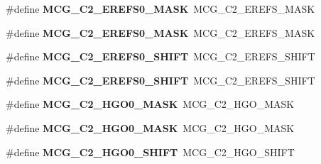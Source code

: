 \begin{DoxyCompactItemize}
\item 
\#define {\bfseries M\+C\+G\+\_\+\+C2\+\_\+\+E\+R\+E\+F\+S0\+\_\+\+M\+A\+SK}~M\+C\+G\+\_\+\+C2\+\_\+\+E\+R\+E\+F\+S\+\_\+\+M\+A\+SK\hypertarget{group__Backward__Compatibility__Symbols_gae9a32b79976c185a9b6567cc74b2d5af}{}\label{group__Backward__Compatibility__Symbols_gae9a32b79976c185a9b6567cc74b2d5af}

\item 
\#define {\bfseries M\+C\+G\+\_\+\+C2\+\_\+\+E\+R\+E\+F\+S0\+\_\+\+M\+A\+SK}~M\+C\+G\+\_\+\+C2\+\_\+\+E\+R\+E\+F\+S\+\_\+\+M\+A\+SK\hypertarget{group__Backward__Compatibility__Symbols_gae9a32b79976c185a9b6567cc74b2d5af}{}\label{group__Backward__Compatibility__Symbols_gae9a32b79976c185a9b6567cc74b2d5af}

\item 
\#define {\bfseries M\+C\+G\+\_\+\+C2\+\_\+\+E\+R\+E\+F\+S0\+\_\+\+S\+H\+I\+FT}~M\+C\+G\+\_\+\+C2\+\_\+\+E\+R\+E\+F\+S\+\_\+\+S\+H\+I\+FT\hypertarget{group__Backward__Compatibility__Symbols_ga1cea960436deb685a7f131203e4898b5}{}\label{group__Backward__Compatibility__Symbols_ga1cea960436deb685a7f131203e4898b5}

\item 
\#define {\bfseries M\+C\+G\+\_\+\+C2\+\_\+\+E\+R\+E\+F\+S0\+\_\+\+S\+H\+I\+FT}~M\+C\+G\+\_\+\+C2\+\_\+\+E\+R\+E\+F\+S\+\_\+\+S\+H\+I\+FT\hypertarget{group__Backward__Compatibility__Symbols_ga1cea960436deb685a7f131203e4898b5}{}\label{group__Backward__Compatibility__Symbols_ga1cea960436deb685a7f131203e4898b5}

\item 
\#define {\bfseries M\+C\+G\+\_\+\+C2\+\_\+\+H\+G\+O0\+\_\+\+M\+A\+SK}~M\+C\+G\+\_\+\+C2\+\_\+\+H\+G\+O\+\_\+\+M\+A\+SK\hypertarget{group__Backward__Compatibility__Symbols_ga58de06b4d4514888ca2e7cbc68e50ccc}{}\label{group__Backward__Compatibility__Symbols_ga58de06b4d4514888ca2e7cbc68e50ccc}

\item 
\#define {\bfseries M\+C\+G\+\_\+\+C2\+\_\+\+H\+G\+O0\+\_\+\+M\+A\+SK}~M\+C\+G\+\_\+\+C2\+\_\+\+H\+G\+O\+\_\+\+M\+A\+SK\hypertarget{group__Backward__Compatibility__Symbols_ga58de06b4d4514888ca2e7cbc68e50ccc}{}\label{group__Backward__Compatibility__Symbols_ga58de06b4d4514888ca2e7cbc68e50ccc}

\item 
\#define {\bfseries M\+C\+G\+\_\+\+C2\+\_\+\+H\+G\+O0\+\_\+\+S\+H\+I\+FT}~M\+C\+G\+\_\+\+C2\+\_\+\+H\+G\+O\+\_\+\+S\+H\+I\+FT\hypertarget{group__Backward__Compatibility__Symbols_ga881979b382aef0029c4e4990e365d8f5}{}\label{group__Backward__Compatibility__Symbols_ga881979b382aef0029c4e4990e365d8f5}


\end{DoxyCompactItemize}
